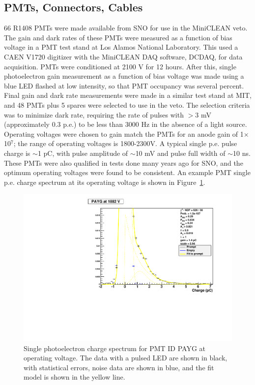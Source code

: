 \documentclass[preprint,12pt]{elsarticle}
\begin{document}
\subsection{PMTs, Connectors, Cables}
\label{sec:pmts}
%
66 R1408 PMTs were made available from SNO for use in the MiniCLEAN
veto. The gain and dark rates of these PMTs were measured as a
function of bias voltage in a PMT test stand at Los Alamos National
Laboratory.  This used a CAEN V1720 digitizer with the MiniCLEAN DAQ
software, DCDAQ, for data acquisition. PMTs were conditioned at 2100 V
for 12 hours. After this, single photoelectron gain measurement as a
function of bias voltage was made using a blue LED flashed at low
intensity, so that PMT occupancy was several percent. Final gain and
dark rate measurements were made in a similar test stand at MIT, and
48 PMTs plus 5 spares were selected to use in the veto.  The selection
criteria was to minimize dark rate, requiring the rate of pulses with
$>$3 mV (approximately 0.3 p.e.) to be less than 3000 Hz in the
absence of a light source.  Operating voltages were chosen to gain
match the PMTs for an anode gain of 1$\times$10$^7$; the range of
operating voltages is 1800-2300V.  A typical single p.e. pulse charge
is $\sim$1 pC, with pulse amplitude of $\sim$10 mV and pulse full width of
$\sim$10 ns.  These PMTs were also qualified in tests done many years ago for
SNO, and the optimum operating voltages were found to be consistent.
An example PMT single p.e. charge spectrum at its operating voltage is
shown in Figure~\ref{fig:pmt_spe_q}.

\begin{figure}[h]
\begin{center}
\includegraphics[width=4.5in]{graphics/PAYG_singlePE.pdf}
\caption{Single photoelectron charge spectrum for PMT ID PAYG at operating voltage.  The data with a pulsed LED are shown in black, with statistical errors, noise data are shown in blue, and the fit model is shown in the yellow line.
\label{fig:pmt_spe_q}}
\end{center}
\end{figure}
\end{document}
